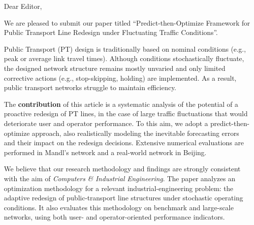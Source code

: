 \documentclass[11pt,a4paper]{letter}
\begin{document}
Dear Editor,

We are pleased to submit our paper titled ``Predict-then-Optimize Framework for Public Transport Line Redesign under Fluctuating Traffic Conditions''. 

Public Transport (PT) design is traditionally based on nominal conditions (e.g., peak or average link travel times). Although conditions stochastically fluctuate, the designed network structure remains mostly unvaried and only limited corrective actions (e.g., stop-skipping, holding) are implemented. As a result, public transport networks struggle to maintain efficiency. 

The \textbf{contribution} of this article is a systematic analysis of the potential of a proactive redesign of PT lines, in the case of large traffic fluctuations that would deteriorate user and operator performance. To this aim, we adopt a predict-then-optimize approach, also realistically modeling the inevitable forecasting errors and their impact on the redesign decisions.
Extensive numerical evaluations are performed in Mandl's network and a real-world network in Beijing.

%

We believe that our research methodology and findings are strongly consistent with the aim of \textit{Computers \& Industrial Engineering}. The paper analyzes an optimization methodology for a relevant industrial-engineering problem: the adaptive redesign of public-transport line structures under stochastic operating conditions. It also evaluates this methodology on benchmark and large-scale networks, using both user- and operator-oriented performance indicators.
\end{document}
